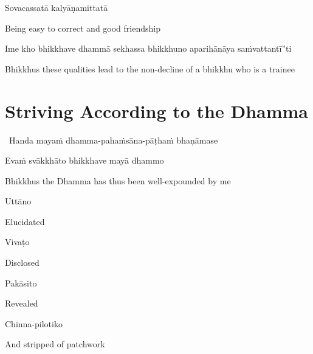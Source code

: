 Sovacassatā kalyāṇamittatā

\begin{english}
  Being easy to correct and good friendship
\end{english}

\begin{pali-hang}
  Ime kho bhikkhave dhammā sekhassa bhikkhuno aparihānāya saṁvattantī''ti
\end{pali-hang}

\begin{english-hang}
  Bhikkhus these qualities lead to the non-decline of a bhikkhu who is a trainee
\end{english-hang}

\suttaRef{[AN 6.22 \& AN 8.79]}


\section{Striving According to the Dhamma}
\label{striving-according-to-dhamma}

\begin{leader}
  \anglebracketleft\ \hspace{-0.5mm}Handa mayaṁ dhamma-pahaṁsāna-pāṭhaṁ bhaṇāmase \hspace{-0.5mm}\anglebracketright\
\end{leader}

Evaṁ svākkhāto bhikkhave mayā dhammo

\begin{english}
  Bhikkhus the Dhamma has thus been well-expounded by me
\end{english}

Uttāno

\begin{english}
  Elucidated
\end{english}

Vivaṭo

\begin{english}
  Disclosed
\end{english}

Pakāsito

\begin{english}
  Revealed
\end{english}

Chinna-pilotiko

\begin{english}
  And stripped of patchwork
\end{english}

